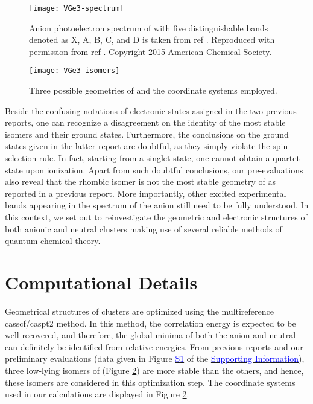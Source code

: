 \begin{refsection}
\begin{figure}[htb!]
	\centering
	\texttt{[image: VGe3-spectrum]}
	\caption{Anion photoelectron spectrum of  with five distinguishable bands denoted as X, A, B, C, and D is taken from ref . Reproduced with permission from ref . Copyright 2015 American Chemical Society.} 
	\label{fig5:spectrum}
\end{figure} 






\begin{figure}[htb!]
	\centering
	\texttt{[image: VGe3-isomers]}
	\caption{Three possible geometries of  and the coordinate systems employed.} 
	\label{fig5:VGe3-iso}
\end{figure} 




Beside the confusing notations of electronic states assigned in the two previous reports, \cite{c5:6, c5:17} one can recognize a disagreement on the identity of the most stable isomers and their ground states. Furthermore, the conclusions on the ground states given in the latter report are doubtful, as they simply violate the spin selection rule. In fact, starting from a singlet state, one cannot obtain a quartet state upon ionization. Apart from such doubtful conclusions, our pre-evaluations also reveal that the rhombic isomer is not the most stable geometry of  as reported in a previous report. \cite{c5:6} More importantly, other excited experimental bands appearing in the spectrum of the anion  still need to be fully understood. In this context, we set out to reinvestigate the geometric and electronic structures of both anionic and neutral clusters  making use of several reliable methods of quantum chemical theory.




\section{Computational Details}


Geometrical structures of  clusters are optimized using the multireference \acrshort{casscf}/\acrshort{caspt2} \cite{c5:18} method. In this method, the correlation energy is expected to be well-recovered, and therefore, the global minima of both the anion and neutral can definitely be identified from relative energies. From previous reports \cite{c5:6, c5:17} and our preliminary evaluations (data given in Figure \href{https://pubs.acs.org/doi/suppl/10.1021/acs.jpca.7b07459/suppl_file/jp7b07459_si_001.pdf}{\textcolor{blue}{S1}} of the \href{https://pubs.acs.org/doi/suppl/10.1021/acs.jpca.7b07459/suppl_file/jp7b07459_si_001.pdf}{\textcolor{blue}{Supporting Information}}), three low-lying isomers of  (Figure \ref{fig5:VGe3-iso}) are more stable than the others, and hence, these isomers are considered in this optimization step. The coordinate systems used in our calculations are displayed in Figure \ref{fig5:VGe3-iso}.





\end{refsection}
